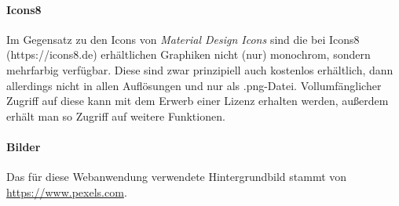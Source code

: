 \paragraph*{Icons8}
\label{sec:technologies:icons8}
Im Gegensatz zu den Icons von \textit{Material Design Icons} sind die bei Icons8 (https://icons8.de) erhältlichen Graphiken nicht (nur) monochrom, sondern mehrfarbig verfügbar. Diese sind zwar prinzipiell auch kostenlos erhältlich, dann allerdings nicht in allen Auflösungen und nur als .png-Datei. Vollumfänglicher Zugriff auf diese kann mit dem Erwerb einer Lizenz erhalten werden, außerdem erhält man so Zugriff auf weitere Funktionen.


\paragraph*{Bilder}
\label{sec:technologies:Images}
Das für diese Webanwendung verwendete Hintergrundbild stammt von \href{https://www.pexels.com}{https://www.pexels.com}.
